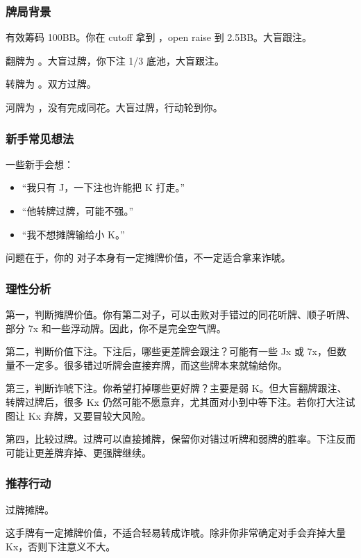 \subsubsection*{牌局背景}

有效筹码 100BB。你在 cutoff 拿到 ，open raise 到 2.5BB。大盲跟注。

翻牌为 。大盲过牌，你下注 1/3 底池，大盲跟注。

转牌为 。双方过牌。

河牌为 ，没有完成同花。大盲过牌，行动轮到你。

\subsubsection*{新手常见想法}

一些新手会想：

\begin{itemize}
\item “我只有 J，一下注也许能把 K 打走。”
\item “他转牌过牌，可能不强。”
\item “我不想摊牌输给小 K。”
\end{itemize}

问题在于，你的  对子本身有一定摊牌价值，不一定适合拿来诈唬。

\subsubsection*{理性分析}

第一，判断摊牌价值。你有第二对子，可以击败对手错过的同花听牌、顺子听牌、部分 7x 和一些浮动牌。因此，你不是完全空气牌。

第二，判断价值下注。下注后，哪些更差牌会跟注？可能有一些 Jx 或 7x，但数量不一定多。很多错过听牌会直接弃牌，而这些牌本来就输给你。

第三，判断诈唬下注。你希望打掉哪些更好牌？主要是弱 K。但大盲翻牌跟注、转牌过牌后，很多 Kx 仍然可能不愿意弃，尤其面对小到中等下注。若你打大注试图让 Kx 弃牌，又要冒较大风险。

第四，比较过牌。过牌可以直接摊牌，保留你对错过听牌和弱牌的胜率。下注反而可能让更差牌弃掉、更强牌继续。

\subsubsection*{推荐行动}

过牌摊牌。

这手牌有一定摊牌价值，不适合轻易转成诈唬。除非你非常确定对手会弃掉大量 Kx，否则下注意义不大。

